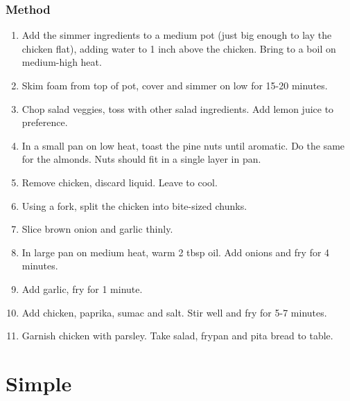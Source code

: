 \documentclass[]{article}
\begin{document}
\subsubsection*{\Large Method}
\begin{enumerate}[font=\huge\color{accent}]
	\item Add the simmer ingredients to a medium pot (just big enough to lay the chicken flat), adding water to 1 inch above the chicken. Bring to a boil on medium-high heat.
	\item Skim foam from top of pot, cover and simmer on low for 15-20 minutes.
	\item Chop salad veggies, toss with other salad ingredients. Add lemon juice to preference.
	\item In a small pan on low heat, toast the pine nuts until aromatic. Do the same for the almonds. Nuts should fit in a single layer in pan.
	\item Remove chicken, discard liquid. Leave to cool.
	\item Using a fork, split the chicken into bite-sized chunks.
	\item Slice brown onion and garlic thinly.
	\item In large pan on medium heat, warm 2 tbsp oil. Add onions and fry for 4 minutes.
	\item Add garlic, fry for 1 minute.
	\item Add chicken, paprika, sumac and salt. Stir well and fry for 5-7 minutes.
	\item Garnish chicken with parsley. Take salad, frypan and pita bread to table.
\end{enumerate}
\newpage
{}
\section*{\center\Huge\color{accent}Simple}
\label{cat:Simple}
\label{rec:Sausages and Chips}
\end{document}
